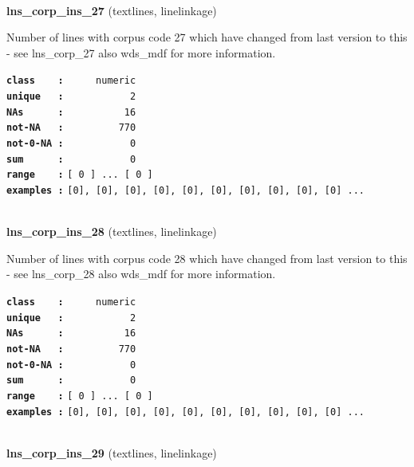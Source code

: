 \documentclass[]{article}
\begin{document}
~

\textbf{lns\_corp\_ins\_27} (textlines, linelinkage)

Number of lines with corpus code 27 which have changed from last version
to this - see lns\_corp\_27 also wds\_mdf for more information.

\textbf{\texttt{class\ \ \ \ :}} \texttt{~~~~~numeric}\\
\textbf{\texttt{unique\ \ \ :}} \texttt{~~~~~~~~~~~2}\\
\textbf{\texttt{NAs\ \ \ \ \ \ :}} \texttt{~~~~~~~~~~16}\\
\textbf{\texttt{not-NA\ \ \ :}} \texttt{~~~~~~~~~770}\\
\textbf{\texttt{not-0-NA\ :}} \texttt{~~~~~~~~~~~0}\\
\textbf{\texttt{sum\ \ \ \ \ \ :}} \texttt{~~~~~~~~~~~0}\\
\textbf{\texttt{range\ \ \ \ :}}
\texttt{{[}\ 0\ {]}\ ...\ {[}\ 0\ {]}}\\
\textbf{\texttt{examples\ :}}
\texttt{{[}0{]},\ {[}0{]},\ {[}0{]},\ {[}0{]},\ {[}0{]},\ {[}0{]},\ {[}0{]},\ {[}0{]},\ {[}0{]},\ {[}0{]}\ ...}\\

~

\textbf{lns\_corp\_ins\_28} (textlines, linelinkage)

Number of lines with corpus code 28 which have changed from last version
to this - see lns\_corp\_28 also wds\_mdf for more information.

\textbf{\texttt{class\ \ \ \ :}} \texttt{~~~~~numeric}\\
\textbf{\texttt{unique\ \ \ :}} \texttt{~~~~~~~~~~~2}\\
\textbf{\texttt{NAs\ \ \ \ \ \ :}} \texttt{~~~~~~~~~~16}\\
\textbf{\texttt{not-NA\ \ \ :}} \texttt{~~~~~~~~~770}\\
\textbf{\texttt{not-0-NA\ :}} \texttt{~~~~~~~~~~~0}\\
\textbf{\texttt{sum\ \ \ \ \ \ :}} \texttt{~~~~~~~~~~~0}\\
\textbf{\texttt{range\ \ \ \ :}}
\texttt{{[}\ 0\ {]}\ ...\ {[}\ 0\ {]}}\\
\textbf{\texttt{examples\ :}}
\texttt{{[}0{]},\ {[}0{]},\ {[}0{]},\ {[}0{]},\ {[}0{]},\ {[}0{]},\ {[}0{]},\ {[}0{]},\ {[}0{]},\ {[}0{]}\ ...}\\

~

\textbf{lns\_corp\_ins\_29} (textlines, linelinkage)
\end{document}
